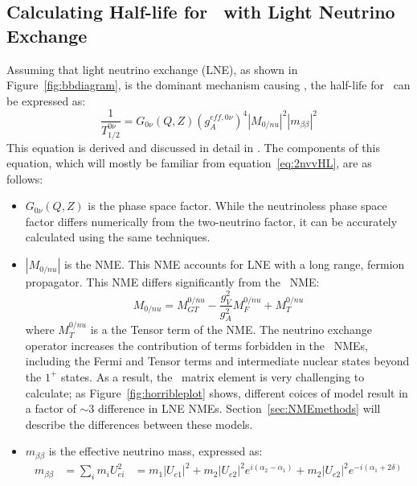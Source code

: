 \documentclass[/main.tex]{subfiles}
\begin{document}
\subsection{Calculating Half-life for \znbb\ with Light Neutrino Exchange}
Assuming that light neutrino exchange (LNE), as shown in Figure~\ref{fig:bbdiagram}, is the dominant mechanism causing \znbb, the half-life for \znbb\ can be expressed as:
\begin{equation}
  \frac{1}{T^{0\nu}_{1/2}}=G_{0\nu}(Q,Z)(g_A^{eff,0\nu})^4|M_{0/nu}|^2|m_{\beta\beta}|^2
\end{equation}
This equation is derived and discussed in detail in \cite{Avignone2008, Engel2017}.
The components of this equation, which will mostly be familiar from equation~\ref{eq:2nvvHL}, are as follows:
\begin{itemize}
\item $G_{0\nu}(Q,Z)$ is the phase space factor.
  While the neutrinoless phase space factor differs numerically from the two-neutrino factor, it can be accurately calculated using the same techniques.
\item $|M_{0/nu}|$ is the NME.
  This NME accounts for LNE with a long range, fermion propagator.
  This NME differs significantly from the \tnbb\ NME:
  \begin{equation}
    M_{0/nu}=M^{0/nu}_{GT} - \frac{g_V^2}{g_A^2}M^{0/nu}_F+M^{0/nu}_T
  \end{equation}
  where $M^{0/nu}_T$ is a the Tensor term of the NME.
  The neutrino exchange operator increases the contribution of terms forbidden in the \tnbb\ NMEs, including the Fermi and Tensor terms and intermediate nuclear states beyond the $1^+$ states.
  As a result, the \znbb\ matrix element is very challenging to calculate; as Figure~\ref{fig:horribleplot} shows, different coices of model result in a factor of $\sim3$ difference in LNE NMEs.
  Section~\ref{sec:NMEmethods} will describe the differences between these models.
\item $m_{\beta\beta}$ is the effective neutrino mass, expressed as:
  \begin{equation} \label{eq:mbb}
    \begin{aligned}
      m_{\beta\beta}&=\sum_i m_iU_{ei}^2
      &=m_1|U_{e1}|^2+m_2|U_{e2}|^2e^{i(\alpha_2-\alpha_1)}+m_2|U_{e2}|^2e^{-i(\alpha_1+2\delta)}
    \end{aligned}
  \end{equation}
  \begin{figure}[p]
    \centering

\end{figure}
\end{itemize}
\end{document}
